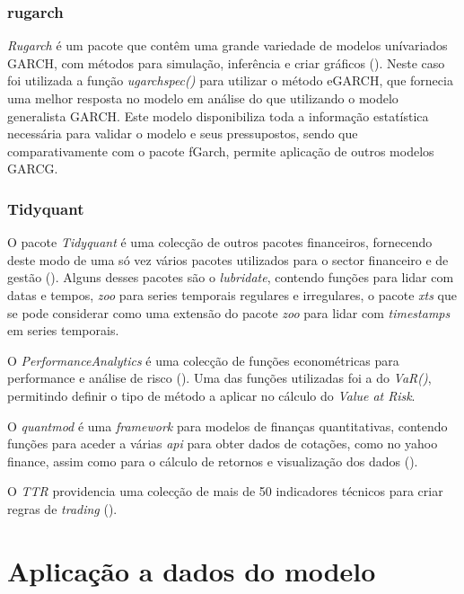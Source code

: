 \documentclass[
  12pt,
  a4paper,
  openany]{book}
\begin{document}
\hypertarget{rugarch}{%
\subsection{rugarch}\label{rugarch}}

\emph{Rugarch} é um pacote que contêm uma grande variedade de modelos unívariados GARCH, com métodos para simulação, inferência e criar gráficos (\citet{rugarch}). Neste caso foi utilizada a função \emph{ugarchspec()} para utilizar o método eGARCH, que fornecia uma melhor resposta no modelo em análise do que utilizando o modelo generalista GARCH. Este modelo disponibiliza toda a informação estatística necessária para validar o modelo e seus pressupostos, sendo que comparativamente com o pacote fGarch, permite aplicação de outros modelos GARCG.

\hypertarget{tidyquant}{%
\subsection{Tidyquant}\label{tidyquant}}

O pacote \emph{Tidyquant} é uma colecção de outros pacotes financeiros, fornecendo deste modo de uma só vez vários pacotes utilizados para o sector financeiro e de gestão (\citet{tidyquant}). Alguns desses pacotes são o \emph{lubridate}, contendo funções para lidar com datas e tempos, \emph{zoo} para series temporais regulares e irregulares, o pacote \emph{xts} que se pode considerar como uma extensão do pacote \emph{zoo} para lidar com \emph{timestamps} em series temporais.

O \emph{PerformanceAnalytics} é uma colecção de funções econométricas para performance e análise de risco (\citet{PerformanceAnalytics}). Uma das funções utilizadas foi a do \emph{VaR()}, permitindo definir o tipo de método a aplicar no cálculo do \emph{Value at Risk}.

O \emph{quantmod} é uma \emph{framework} para modelos de finanças quantitativas, contendo funções para aceder a várias \emph{api} para obter dados de cotações, como no yahoo finance, assim como para o cálculo de retornos e visualização dos dados (\citet{quantmod}).

O \emph{TTR} providencia uma colecção de mais de 50 indicadores técnicos para criar regras de \emph{trading} (\citet{TTR}).

\hypertarget{aplicauxe7uxe3o-a-dados-do-modelo}{%
\chapter{Aplicação a dados do modelo}\label{aplicauxe7uxe3o-a-dados-do-modelo}}
\end{document}
